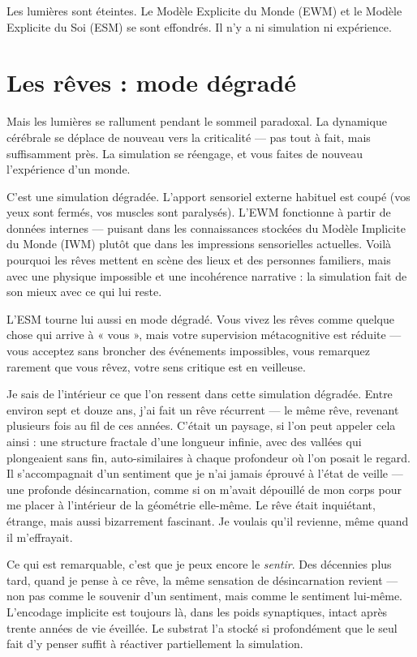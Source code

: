 \documentclass[11pt, twoside, openright]{book}
\begin{document}
Les lumières sont éteintes. Le Modèle Explicite du Monde (EWM) et le Modèle Explicite du Soi (ESM) se sont effondrés. Il n'y a ni simulation ni expérience.

\section*{Les rêves : mode dégradé}

Mais les lumières se rallument pendant le sommeil paradoxal. La dynamique cérébrale se déplace de nouveau vers la criticalité --- pas tout à fait, mais suffisamment près. La simulation se réengage, et vous faites de nouveau l'expérience d'un monde.

C'est une simulation dégradée. L'apport sensoriel externe habituel est coupé (vos yeux sont fermés, vos muscles sont paralysés). L'EWM fonctionne à partir de données internes --- puisant dans les connaissances stockées du Modèle Implicite du Monde (IWM) plutôt que dans les impressions sensorielles actuelles. Voilà pourquoi les rêves mettent en scène des lieux et des personnes familiers, mais avec une physique impossible et une incohérence narrative : la simulation fait de son mieux avec ce qui lui reste.

L'ESM tourne lui aussi en mode dégradé. Vous vivez les rêves comme quelque chose qui arrive à « vous », mais votre supervision métacognitive est réduite --- vous acceptez sans broncher des événements impossibles, vous remarquez rarement que vous rêvez, votre sens critique est en veilleuse.

Je sais de l'intérieur ce que l'on ressent dans cette simulation dégradée. Entre environ sept et douze ans, j'ai fait un rêve récurrent --- le même rêve, revenant plusieurs fois au fil de ces années. C'était un paysage, si l'on peut appeler cela ainsi : une structure fractale d'une longueur infinie, avec des vallées qui plongeaient sans fin, auto-similaires à chaque profondeur où l'on posait le regard. Il s'accompagnait d'un sentiment que je n'ai jamais éprouvé à l'état de veille --- une profonde désincarnation, comme si on m'avait dépouillé de mon corps pour me placer à l'intérieur de la géométrie elle-même. Le rêve était inquiétant, étrange, mais aussi bizarrement fascinant. Je voulais qu'il revienne, même quand il m'effrayait.

Ce qui est remarquable, c'est que je peux encore le \textit{sentir}. Des décennies plus tard, quand je pense à ce rêve, la même sensation de désincarnation revient --- non pas comme le souvenir d'un sentiment, mais comme le sentiment lui-même. L'encodage implicite est toujours là, dans les poids synaptiques, intact après trente années de vie éveillée. Le substrat l'a stocké si profondément que le seul fait d'y penser suffit à réactiver partiellement la simulation.
\end{document}
